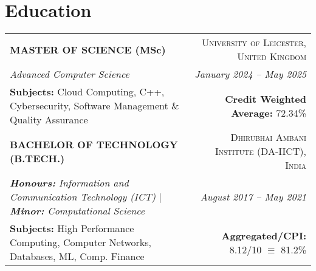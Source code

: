 \section{\Large Education}
\noindent
\begin{tabularx}{\textwidth}{@{}X r@{}}  
    \textbf{\uppercase{Master of Science} (MSc)} & \textsc{University of Leicester, United Kingdom} \\  
    \textit{Advanced Computer Science} & \textit{January 2024 – May 2025} \\
    \textbf{Subjects:} Cloud Computing, C++, Cybersecurity, Software Management \& Quality Assurance & \textbf{Credit Weighted Average:} 72.34\% \\
    [4pt]  
    \textbf{\uppercase{Bachelor of Technology (B.Tech.)}} & \textsc{Dhirubhai Ambani Institute (DA-IICT), India} \\  
    \textit{\textbf{Honours:} Information and Communication Technology (ICT)} \quad | \quad \textit{\textbf{Minor:} Computational Science} & \textit{August 2017 – May 2021} \\  
    \textbf{Subjects:} High Performance Computing, Computer Networks, Databases, ML, Comp. Finance & \textbf{Aggregated/CPI:} 8.12/10 $\equiv$ 81.2\% \\  
\end{tabularx}
